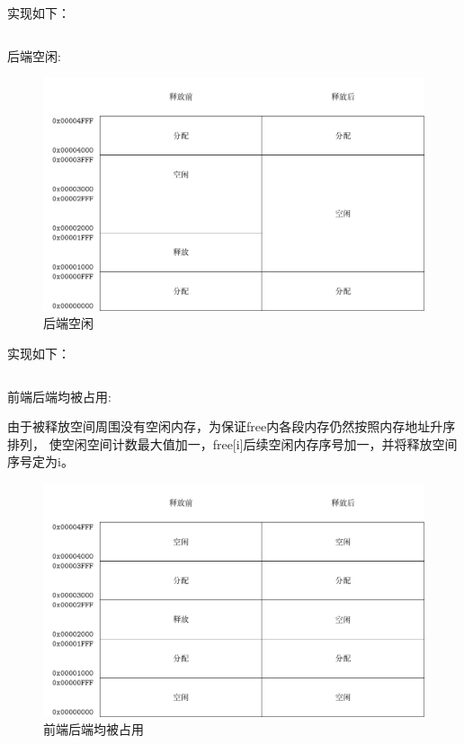 \newpage
实现如下：

\begin{listing}[H]
  \inputminted[tabsize=2, firstline=98, lastline=116,
  linenos=true]{c}{../ZOS/src/kernel/memory.c}
\end{listing}

\newpage
后端空闲:

\begin{figure}[h]
  \centering
  \includegraphics[width=.8\textwidth]{fig/mem2.pdf}
  \caption{后端空闲}
  \label{fig:mem3}
\end{figure}

实现如下：

\begin{listing}[H]
  \inputminted[tabsize=2, firstline=118, lastline=127,
  linenos=true]{c}{../ZOS/src/kernel/memory.c}
\end{listing}

\newpage
前端后端均被占用:

由于被释放空间周围没有空闲内存，为保证free内各段内存仍然按照内存地址升序排列，
使空闲空间计数最大值加一，free[i]后续空闲内存序号加一，并将释放空间序号定为i。
\begin{figure}[h]
  \centering
  \includegraphics[width=.8\textwidth]{fig/mem3.pdf}
  \caption{前端后端均被占用}
  \label{fig:mem4}
\end{figure}

